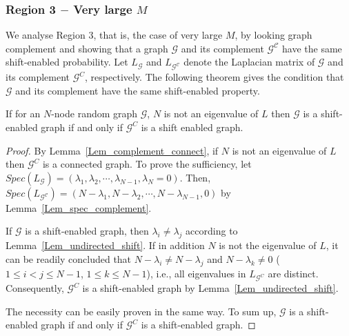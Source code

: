 \documentclass[journal]{IEEEtran}
\begin{document}
\subsubsection{Region 3 $-$ Very large $M$}\label{sec: Region 3}



We analyse Region 3, that is, the case of very large $M$, by looking graph complement and showing that a graph ${\mathcal{G}}$ and its complement ${\mathcal{G^C}}$ have the same shift-enabled probability. Let $L_{\mathcal{G}}$ and $L_{\mathcal{G^C}}$ denote the Laplacian matrix of ${\mathcal{G}}$ and its complement ${\mathcal{G}^C}$, respectively. 
The following theorem gives the condition that  $\mathcal{G}$ and its complement have the same shift-enabled property.
\begin{Thm}{\label{Thm_complement_shift}}
	If for an $N$-node random graph $\mathcal{G}$, $N$ is not an eigenvalue of $L$ then $\mathcal{G}$ is a shift-enabled graph if and only if $\mathcal{G}^C$ is a shift enabled graph.
\end{Thm}
\begin{proof}
By Lemma~\ref{Lem_complement_connect}, if $N$ is not an eigenvalue of $L$ then $\mathcal{G}^C$ is a connected graph.
	To prove the sufficiency, let $Spec(L_{\mathcal{G}})=(\lambda_1, \lambda_2, \cdots, \lambda_{N-1},\lambda_N=0)$. %
	Then, $Spec(L_{\mathcal{G^C}})=(N-\lambda_1, N-\lambda_2,  \cdots,N-\lambda_{N-1} , 0)$ by  Lemma~\ref{Lem_spec_complement}.
	
	If $\mathcal{G}$ is a shift-enabled graph, then $\lambda_i \neq \lambda_j$  %
	according to Lemma~\ref{Lem_undirected_shift}.
	If in addition $N$ is not the eigenvalue of $L$, it can be readily concluded that
	$N-\lambda_i \neq N-\lambda_j$ and $N-\lambda_k \neq 0$  ($1\leq i<j\leq N-1$, $1\leq k\leq N-1$), i.e., all eigenvalues in $L_{\mathcal{G}^C}$ are distinct. Consequently,  $\mathcal{G}^C$ is a shift-enabled graph
	by Lemma~\ref{Lem_undirected_shift}.
	
	The necessity can be easily proven in the  same way.
	To sum up, $\mathcal{G}$ is a shift-enabled graph if and only if $\mathcal{G}^C$ is a shift-enabled graph.
\end{proof}
\end{document}
